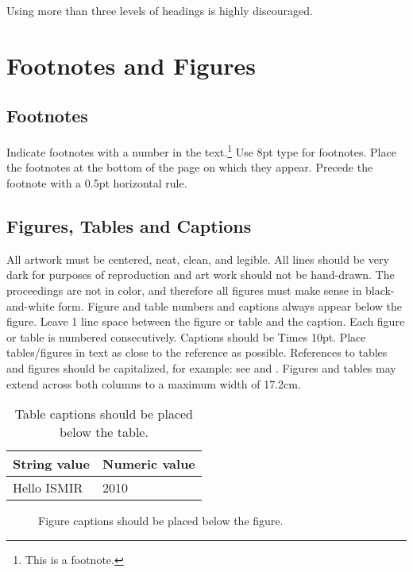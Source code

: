 \documentclass{article}
\begin{document}
Using more than three levels of headings is highly discouraged.

\section{Footnotes and Figures}

\subsection{Footnotes}

Indicate footnotes with a number in the text.\footnote{This is a footnote.} 
Use 8pt type for footnotes. Place the footnotes at the bottom of the page on which they appear. 
Precede the footnote with a 0.5pt horizontal rule.

\subsection{Figures, Tables and Captions}

All artwork must be centered, neat, clean, and legible. 
All lines should be very dark for purposes of reproduction and art work should not be hand-drawn. 
The proceedings are not in color, and therefore all figures must make sense in black-and-white form. 
Figure and table numbers and captions always appear below the figure. 
Leave 1 line space between the figure or table and the caption. 
Each figure or table is numbered consecutively. Captions should be Times 10pt. 
Place tables/figures in text as close to the reference as possible. 
References to tables and figures should be capitalized, for example: 
see  and . 
Figures and tables may extend across both columns to a maximum width of 17.2cm.

\begin{table}
 \begin{center}
 \begin{tabular}{|l|l|}
  \hline
  String value & Numeric value \\
  \hline
  Hello ISMIR  & 2010 \\
  \hline
 \end{tabular}
\end{center}
 \caption{Table captions should be placed below the table.}
 \label{tab:example}
\end{table}
 
\begin{figure}
 \centerline{}
 \caption{Figure captions should be placed below the figure.}
 \label{fig:example}
\end{figure}
 
\end{document}
